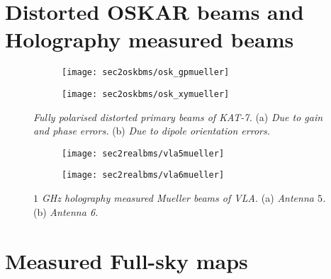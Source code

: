 \documentclass[fleqn,usenatbib]{mnras}
\begin{document}
\section{Distorted OSKAR beams and Holography measured beams} \label{sec:A}
 \begin{figure*}
 \begin{minipage}[!b]{\linewidth}
  \centering
     \begin{subfigure}[b]{0.495\textwidth}
                \texttt{[image: sec2oskbms/osk\_gpmueller]}
                \caption{}
                \label{fig:A1a}
        \end{subfigure}       
        \begin{subfigure}[b]{0.485\textwidth}
                \texttt{[image: sec2oskbms/osk\_xymueller]}
                \caption{}
               \label{fig:A1b}
        \end{subfigure}
         \end{minipage}
        \caption{\textit{Fully polarised distorted primary beams of KAT-7.} (a) \textit{Due to gain and phase errors.}  (b) \textit{Due to dipole orientation errors.}
      }
	    \label{fig:A1}
  \end{figure*}
\begin{figure*}
  \centering
  \begin{minipage}[H]{\linewidth}
     \begin{subfigure}[b]{0.495\textwidth}
                \texttt{[image: sec2realbms/vla5mueller]}
                \caption{}
                \label{fig:A2a}
        \end{subfigure}       
        \begin{subfigure}[b]{0.485\textwidth}
                \texttt{[image: sec2realbms/vla6mueller]}
                \caption{}
               \label{fig:A2b}
        \end{subfigure}         
         \end{minipage}
        \caption{\textit{$1$ GHz holography measured Mueller beams of VLA.} (a) \textit{Antenna $5$.}
      (b) \textit{Antenna 6.}
      }
	    \label{fig:A2}
  \end{figure*}


\section{Measured Full-sky maps} \label{sec:B}
%
\end{document}
